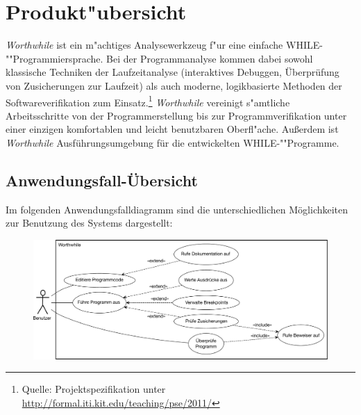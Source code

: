 \section{Produkt"ubersicht}%

\textit{Worthwhile} ist ein m"achtiges Analysewerkzeug f"ur eine einfache WHILE-""Programmiersprache. Bei der Programmanalyse kommen dabei sowohl klassische Techniken der Laufzeitanalyse (interaktives Debuggen, Überprüfung von Zusicherungen zur Laufzeit) als auch moderne, logikbasierte Methoden der Softwareverifikation zum Einsatz.\footnote{Quelle: Projektspezifikation unter \url{http://formal.iti.kit.edu/teaching/pse/2011/}} \textit{Worthwhile} vereinigt s"amtliche Arbeitsschritte von der Programmerstellung bis zur Programmverifikation unter einer einzigen komfortablen und leicht benutzbaren Oberfl"ache. Außerdem ist \textit{Worthwhile} Ausführungsumgebung für die entwickelten WHILE-""Programme.%

\subsection{Anwendungsfall-Übersicht}

Im folgenden Anwendungsfalldiagramm sind die unterschiedlichen Möglichkeiten zur Benutzung des Systems dargestellt:

\begin{figure}[H]
	\includegraphics[width=\textwidth]{usecase/usecase.pdf}
\end{figure}